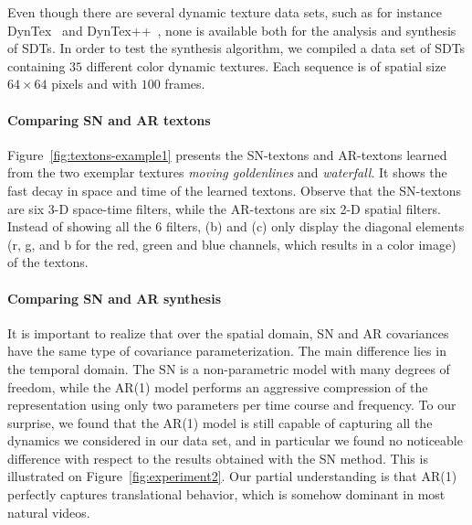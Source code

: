 Even though there are several dynamic texture data sets, such as for instance DynTex~\cite{dyntex} and DynTex++~\cite{GhanemA07}, none is available both for the analysis and synthesis of SDTs. In order to test the synthesis algorithm, we compiled a data set of SDTs containing $35$ different color dynamic textures. Each sequence is of spatial size $64 \times 64$ pixels and with $100$ frames.


\paragraph{Comparing SN and AR textons}

Figure~\ref{fig:textons-example1} presents the SN-textons and AR-textons learned from the two exemplar textures {\it moving goldenlines} and {\it waterfall}. It shows the  fast decay in space and time of the learned textons.  Observe that the SN-textons are six 3-D space-time filters, while the AR-textons are six 2-D spatial filters. Instead of showing all the 6 filters, (b) and (c) only display the diagonal elements (r, g, and b for the red, green and blue channels, which results in a color image) of the textons. 

\paragraph{Comparing SN and AR synthesis}

It is important to realize that over the spatial domain, SN and AR covariances have the same type of covariance parameterization. The main difference lies in the temporal domain. The SN is a non-parametric model with many degrees of freedom, while the AR(1) model performs an aggressive compression of the representation using only two parameters per time course and frequency. To our surprise, we found that the AR(1) model is still capable of capturing all the dynamics we considered in our data set, and in particular we found no noticeable difference with respect to the results obtained with the SN method. This is illustrated on Figure~\ref{fig:experiment2}. Our partial understanding is that AR(1) perfectly captures translational behavior, which is somehow dominant in most natural videos. 


